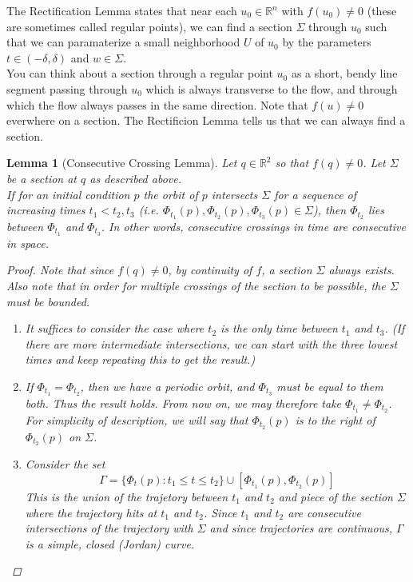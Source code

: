 \documentclass{article}
\newtheorem{lemma}[theorem]{Lemma}
\def\R{{\mathbb R}}
\begin{document}
The Rectification Lemma states that near each $u_0 \in \R^n$ with $f(u_0) \neq 0$ (these are sometimes called regular points), we can find a section $\Sigma$ through $u_0$ such that we can paramaterize a small neighborhood $U$ of $u_0$ by the parameters $t \in (-\delta, \delta)$ and $w \in \Sigma$. \\

You can think about a section through a regular point $u_0$ as a short, bendy line segment passing through $u_0$ which is always transverse to the flow, and through which the flow always passes in the same direction. Note that $f(u) \neq 0$ everwhere on a section. The Rectificion Lemma tells us that we can always find a section.


\begin{lemma}[Consecutive Crossing Lemma]Let $q \in \R^2$ so that $f(q) \neq 0$. Let $\Sigma$ be a section at $q$ as described above.\\

If for an initial condition $p$ the orbit of $p$ intersects $\Sigma$ for a sequence of increasing times $t_1 < t_2, t_3$ (i.e. $\Phi_{t_1}(p), \Phi_{t_2}(p), \Phi_{t_3}(p) \in \Sigma$), then $\Phi_{t_2}$ lies between $\Phi_{t_1}$ and $\Phi_{t_3}$. In other words, consecutive crossings in time are consecutive in space.\\

\begin{proof}

Note that since $f(q) \neq 0$, by continuity of $f$, a section $\Sigma$ always exists. Also note that in order for multiple crossings of the section to be possible, the $\Sigma$ must be bounded.
\begin{enumerate}
\item It suffices to consider the case where $t_2$ is the only time between $t_1$ and $t_3$. (If there are more intermediate intersections, we can start with the three lowest times and keep repeating this to get the result.)

\item If $\Phi_{t_1} = \Phi_{t_2}$, then we have a periodic orbit, and $\Phi_{t_3}$ must be equal to them both. Thus the result holds. From now on, we may therefore take $\Phi_{t_1} \neq \Phi_{t_2}$. For simplicity of description, we will say that $\Phi_{t_2}(p)$ is to the right of $\Phi_{t_2}(p)$ on $\Sigma$. 

\item Consider the set
\[
\Gamma = \{ \Phi_t(p) : t_1 \leq t \leq t_2 \} \cup
[\Phi_{t_1}(p), \Phi_{t_2}(p)]
\]
This is the union of the trajetory between $t_1$ and $t_2$ and piece of the section $\Sigma$ where the trajectory hits at $t_1$ and $t_2$. Since $t_1$ and $t_2$ are consecutive intersections of the trajectory with $\Sigma$ and since trajectories are continuous, $\Gamma$ is a simple, closed (Jordan) curve.


\end{enumerate}
\end{proof}
\end{lemma}
\end{document}
